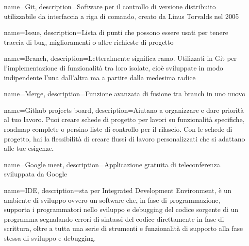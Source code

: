 {
	name={Git},
	description={Software per il controllo di versione distribuito utilizzabile da interfaccia a riga di comando, creato da Linus Torvalds nel 2005}
}

{
	name={Issue},
	description={Lista di punti che possono essere usati per tenere traccia di bug, miglioramenti o altre richieste di progetto}
}

{
	name={Branch},
	description={Letteralmente significa ramo. Utilizzati in Git per l'implementazione di funzionalità tra loro isolate, cioè sviluppate in modo indipendente l'una dall'altra ma a partire dalla medesima radice}
}

{
	name={Merge},
	description={Funzione avanzata di fusione tra branch in uno nuovo}
}

{
	name={Github projects board},
	description={Aiutano a organizzare e dare priorità al tuo lavoro. Puoi creare schede di progetto per lavori su funzionalità specifiche, roadmap complete o persino liste di controllo per il rilascio. Con le schede di progetto, hai la flessibilità di creare flussi di lavoro personalizzati che si adattano alle tue esigenze.}
}

{
	name={Google meet},
	description={Applicazione gratuita di teleconferenza sviluppata da Google}
}

{
	name={IDE},
	description={sta per Integrated Development Environment, è un ambiente di sviluppo ovvero un software che, in fase di programmazione, supporta i programmatori nello sviluppo e debugging del codice sorgente di un programma segnalando errori di sintassi del codice direttamente in fase di scrittura, oltre a tutta una serie di strumenti e funzionalità di supporto alla fase stessa di sviluppo e debugging.}
}